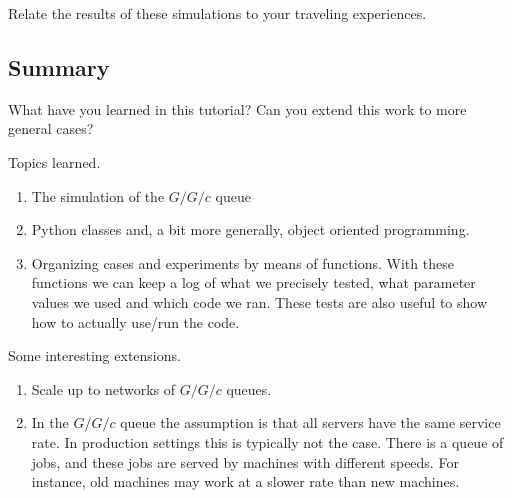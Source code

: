 \begin{exercise}
  Relate the results of these simulations to your traveling experiences.
\end{exercise}


\subsection{Summary}
\label{sec:summary-4}


\begin{exercise}
  What have you learned in this tutorial?
 Can you extend this work to more general cases?
\begin{solution}
    Topics learned.
    \begin{enumerate}
    \item The simulation of the $G/G/c$ queue
    \item Python classes and, a bit more generally, object oriented programming.
    \item Organizing cases and experiments by means of  functions. With these functions we can keep a log of what we precisely tested, what parameter values we used and which code we ran. These tests are also useful to show how to actually use/run the code.
    \end{enumerate}

Some  interesting extensions.
    \begin{enumerate}
    \item   Scale up to networks of $G/G/c$ queues.
    \item In the $G/G/c$ queue the assumption is that all servers have the same service rate.
      In production settings this is typically not the case.
      There is a queue of jobs, and these jobs are served by machines with different speeds.
      For instance, old machines may work at a slower rate than new machines.
    \end{enumerate}
  \end{solution}
\end{exercise}
